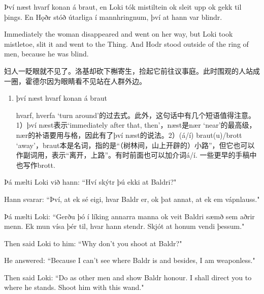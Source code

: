 \begin{paracol}{2}
    Því næst hvarf konan á braut, en Loki tók mistiltein ok sleit upp ok gekk til þings. En Hǫðr stóð útarliga í mann\-hringnum, því at hann var blindr.

    \switchcolumn

    Immediately the woman disappeared and went on her way, but Loki took mistletoe, slit it and went to the Thing. And Hodr stood outside of the ring of men, because he was blind.
\end{paracol}
\begin{translation*}{}
    妇人一眨眼就不见了。洛基却砍下槲寄生，捡起它前往议事庭。此时围观的人站成一圈，霍德尔因为眼睛看不见站在人群外边。
\end{translation*}
\begin{grammar*}{}
    \begin{enumerate}[leftmargin=*]
        \item því næst hvarf konan á braut

              hvarf, hverfa `turn around'的过去式。此外，这句话中有几个短语值得注意。1）því næst表示`immediately after that, then'，næst是nær `near'的最高级，nær的补语要用与格，因此有了því næst的说法。2）(á/í) braut(u)/brott `away'，braut本是名词，指的是“（树林间，山上开辟的）小路”，但它也可以作副词用，表示“离开，上路”。有时前面也可以加介词á/í. 一些更早的手稿中也写作brott.
    \end{enumerate}
\end{grammar*}
\begin{paracol}{2}
    Þá mælti Loki við hann: ``Hví skýtr þú ekki at Baldri?"

    Hann svarar: ``Því, at ek sé eigi, hvar Baldr er, ok þat annat, at ek em vápnlauss."

    Þá mælti Loki: ``Gerðu þó í líking annarra manna ok veit Baldri sæmð sem aðrir menn. Ek mun vísa þér til, hvar hann stendr. Skjót at honum vendi þessum."\\

    \switchcolumn

    Then said Loki to him: ``Why don't you shoot at Baldr?"

    He answered: ``Because I can't see where Baldr is and besides, I am weaponless."

    Then said Loki: ``Do as other men and show Baldr honour. I shall direct you to where he stands. Shoot him with this wand."
\end{paracol}

